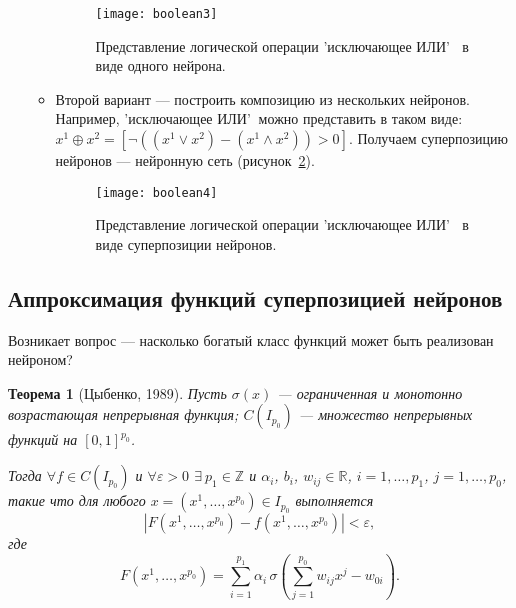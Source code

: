 \documentclass{article}
\newtheorem{theorem}{Теорема}
\begin{document}
\begin{enumerate}
\begin{itemize}
			\begin{figure}[H]
				\begin{center}
					\begin{minipage}{0.75\linewidth}
						\texttt{[image: boolean3]}
						\caption{Представление логической операции 'исключающее ИЛИ' $~$ в виде одного нейрона.}
						\label{boolean3}
					\end{minipage}
				\end{center}
			\end{figure}
			
			\item Второй вариант --- построить композицию из нескольких нейронов. Например, 'исключающее ИЛИ'$~$ можно представить в таком виде: $x^1 \oplus x^2 = [\lnot((x^1\lor x^2) - (x^1 \wedge x^2))>0]$. Получаем суперпозицию нейронов --- нейронную сеть (рисунок~\ref{boolean4}).
			
			\begin{figure}[H]
				\begin{center}
					\begin{minipage}{0.75\linewidth}
						\texttt{[image: boolean4]}
						\caption{Представление логической операции 'исключающее ИЛИ' $~$ в виде суперпозиции нейронов.}
						\label{boolean4}
					\end{minipage}
				\end{center}
			\end{figure}
			
		\end{itemize}
	\end{enumerate}
	
	\subsection{Аппроксимация функций суперпозицией нейронов}
	
	Возникает вопрос --- насколько богатый класс функций может быть реализован нейроном? 
	
	\begin{theorem}[Цыбенко, 1989]
		Пусть $\sigma(x)$ --- ограниченная и монотонно возрастающая непрерывная функция; $C(I_{p_0})$ --- множество непрерывных функций на $[0,1]^{p_0}$.
		
		Тогда $\forall f \in C(I_{p_0})$ и $\forall \varepsilon > 0$  $\exists ~p_1 \in \mathbb{Z}$ и  $\alpha_i$, $b_i$, $w_{ij} \in \mathbb{R}$, $i=1,\ldots,p_1$, $j=1,\ldots, p_0$, такие что для любого $x=(x^1, \ldots, x^{p_0}) \in I_{p_0}$ выполняется
		\begin{equation*}
			| F(x^1, \ldots, x^{p_0}) - f(x^1, \ldots, x^{p_0})| < \varepsilon,
		\end{equation*}
		где  \begin{equation*}
			F(x^1, \ldots, x^{p_0})=\sum_{i=1}^{p_1} \alpha_i \, \sigma \left(\sum_{j=1}^{p_0} w_{ij} x^j  -w_{0i}   \right).
		\end{equation*}
	\end{theorem}	
	
\end{document}
